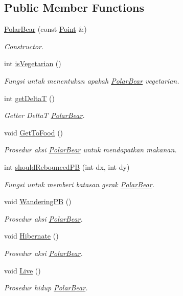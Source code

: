 \subsection*{Public Member Functions}
\begin{DoxyCompactItemize}
\item 
\hyperlink{class_polar_bear_ad6a4789bb79ea33f3f97e9e5e1b05810}{Polar\+Bear} (const \hyperlink{class_point}{Point} \&)
\begin{DoxyCompactList}\small\item\em Constructor. \end{DoxyCompactList}\item 
int \hyperlink{class_polar_bear_a528b34c3db1dee2cd5c06f6b6d221a14}{is\+Vegetarian} ()
\begin{DoxyCompactList}\small\item\em Fungsi untuk menentukan apakah \hyperlink{class_polar_bear}{Polar\+Bear} vegetarian. \end{DoxyCompactList}\item 
int \hyperlink{class_polar_bear_a636383dd8f5c357f205642a8b0354a55}{get\+DeltaT} ()
\begin{DoxyCompactList}\small\item\em Getter DeltaT \hyperlink{class_polar_bear}{Polar\+Bear}. \end{DoxyCompactList}\item 
void \hyperlink{class_polar_bear_a4b2f0d6aab60ceba83a1ced4c305ed3f}{Get\+To\+Food} ()
\begin{DoxyCompactList}\small\item\em Prosedur aksi \hyperlink{class_polar_bear}{Polar\+Bear} untuk mendapatkan makanan. \end{DoxyCompactList}\item 
int \hyperlink{class_polar_bear_a5d3f0e522a1147e97411d9bd9fcb24f7}{should\+Rebounced\+PB} (int dx, int dy)
\begin{DoxyCompactList}\small\item\em Fungsi untuk memberi batasan gerak \hyperlink{class_polar_bear}{Polar\+Bear}. \end{DoxyCompactList}\item 
void \hyperlink{class_polar_bear_ad7fd02aefe77c62d9f1bb616fb86c42d}{Wandering\+PB} ()
\begin{DoxyCompactList}\small\item\em Prosedur aksi \hyperlink{class_polar_bear}{Polar\+Bear}. \end{DoxyCompactList}\item 
void \hyperlink{class_polar_bear_adda1bd12ca6b6ac4df08f527bd9e2e7d}{Hibernate} ()
\begin{DoxyCompactList}\small\item\em Prosedur aksi \hyperlink{class_polar_bear}{Polar\+Bear}. \end{DoxyCompactList}\item 
void \hyperlink{class_polar_bear_aecb4f132a925275d4e730b58fc79158b}{Live} ()
\begin{DoxyCompactList}\small\item\em Prosedur hidup \hyperlink{class_polar_bear}{Polar\+Bear}. \end{DoxyCompactList}\end{DoxyCompactItemize}
